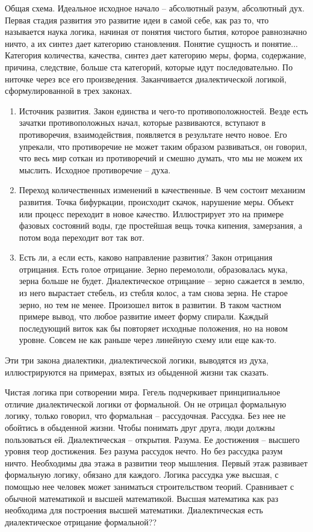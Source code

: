 \documentclass[a4paper, 12pt]{article}
\begin{document}
Общая схема. Идеальное исходное начало -- абсолютный разум, абсолютный 
дух. Первая стадия развития это развитие идеи в самой себе, как раз то, 
что называется наука логика, начиная от понятия чистого бытия, которое 
равнозначно ничто, а их синтез дает категорию становления. Понятие 
сущность и понятие... Категория количества, качества, синтез дает 
категорию меры, форма, содержание, причина, следствие, больше ста 
категорий, которые идут последовательно. По ниточке через все его 
произведения. Заканчивается диалектической логикой, сформулированной 
в трех законах.
\begin{enumerate}
  \item Источник развития. Закон единства и чего-то противоположностей. 
    Везде есть зачатки противоположных начал, которые развиваются, 
    вступают в противоречия, взаимодействия, появляется в результате 
    нечто новое. Его упрекали, что противоречие не может таким образом 
    развиваться, он говорил, что весь мир соткан из противоречий 
    и смешно думать, что мы не можем их мыслить. Исходное противоречие 
    -- духа.
  \item Переход количественных изменений в качественные. В чем состоит 
    механизм развития. Точка бифуркации, происходит скачок, нарушение 
    меры. Объект или процесс переходит в новое качество. Иллюстрирует 
    это на примере фазовых состояний воды, где простейшая вещь точка 
    кипения, замерзания, а потом вода переходит вот так вот.
  \item Есть ли, а если есть, каково направление развития? Закон 
  отрицания отрицания. Есть голое отрицание. Зерно перемололи, 
    образовалась мука, зерна больше не будет. Диалектическое отрицание 
    -- зерно сажается в землю, из него вырастает стебель, из стебля 
    колос, а там снова зерна. Не старое зерно, но тем не менее. 
    Произошел виток в развитии. В таком частном примере вывод, что любое 
    развитие имеет форму спирали. Каждый последующий виток как бы 
    повторяет исходные положения, но на новом уровне. Совсем не как 
    раньше через линейную схему или еще как-то.
\end{enumerate}
Эти три закона диалектики, диалектической логики, выводятся из духа, 
иллюстрируются на примерах, взятых из обыденной жизни так сказать.

Чистая логика при сотворении мира. Гегель подчеркивает принципиальное 
отличие диалектической логики от формальной. Он не отрицал формальную 
логику, только говорил, что формальная -- рассудочная. Рассудка. Без нее 
не обойтись в обыденной жизни. Чтобы понимать друг друга, люди должны 
пользоваться ей. Диалектическая -- открытия. Разума. Ее достижения -- 
высшего уровня теор достижения. Без разума рассудок нечто. Но без 
рассудка разум ничто. Необходимы два этажа в развитии теор мышления. 
Первый этаж развивает формальную логику, обязано для каждого. Логика 
рассудка уже высшая, с помощью нее человек может заниматься 
строительством теорий. Сравнивает с обычной математикой и высшей 
математикой. Высшая математика как раз необходима для построения высшей 
математики. Диалектическая есть диалектическое отрицание формальной??
\end{document}
